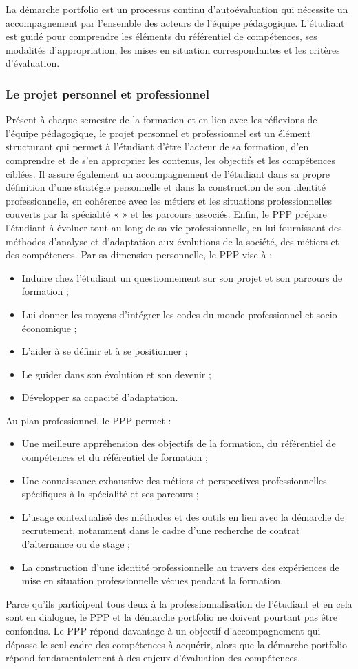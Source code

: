 \documentclass[10pt]{article}
\begin{document}
La démarche portfolio est un processus continu d’autoévaluation qui
nécessite un accompagnement par l’ensemble des acteurs de l’équipe
pédagogique. L’étudiant est guidé pour comprendre les éléments du
référentiel de compétences, ses modalités d’appropriation, les mises en
situation correspondantes et les critères d’évaluation.

\subsubsection*{Le projet personnel et professionnel}
Présent à chaque semestre de la formation et en lien avec les réflexions
de l’équipe pédagogique, le projet personnel et professionnel est un
élément structurant qui permet à l’étudiant d’être l’acteur de sa
formation, d’en comprendre et de s’en approprier les contenus, les
objectifs et les compétences ciblées. Il assure également un
accompagnement de l’étudiant dans sa propre définition d’une stratégie
personnelle et dans la construction de son identité professionnelle, en
cohérence avec les métiers et les situations professionnelles couverts
par la spécialité «  » et les parcours associés. Enfin, le PPP prépare
l’étudiant à évoluer tout au long de sa vie professionnelle, en lui
fournissant des méthodes d’analyse et d’adaptation aux évolutions de la
société, des métiers et des compétences.  Par sa dimension personnelle,
le PPP vise à :
\begin{itemize}
\item Induire chez l’étudiant un questionnement sur
  son projet et son parcours de formation ;
\item Lui donner les moyens d’intégrer les codes du
  monde professionnel et socio-économique ;
\item L’aider à se définir et à se positionner ;
\item Le guider dans son évolution et son devenir ;
\item Développer sa capacité d’adaptation.
\end{itemize}
Au plan professionnel, le PPP permet :
\begin{itemize}
\item Une meilleure appréhension des objectifs de la formation, du
  référentiel de compétences et du référentiel de formation ;
\item Une connaissance exhaustive des métiers et perspectives
  professionnelles spécifiques à la spécialité et ses parcours ;
\item L’usage contextualisé des méthodes et des outils en lien avec la
  démarche de recrutement, notamment dans le cadre d’une recherche de
  contrat d’alternance ou de stage ;
\item La construction d’une identité professionnelle au travers des
  expériences de mise en situation professionnelle vécues pendant la
  formation.
\end{itemize}
Parce qu’ils participent tous deux à la professionnalisation de
l’étudiant et en cela sont en dialogue, le PPP et la démarche portfolio
ne doivent pourtant pas être confondus. Le PPP répond davantage à un
objectif d’accompagnement qui dépasse le seul cadre des compétences à
acquérir, alors que la démarche portfolio répond fondamentalement à des
enjeux d’évaluation des compétences.
\end{document}
